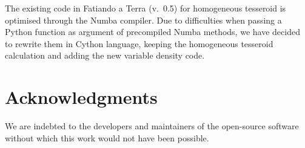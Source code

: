 \documentclass[extra]{gji}
\begin{document}
The existing code in Fatiando a Terra (v.~0.5) for homogeneous tesseroid is optimised through the Numba compiler.
Due to difficulties when passing a Python function as argument of precompiled Numba methods, we have decided to rewrite them in Cython language, keeping the homogeneous tesseroid calculation and adding the new variable density code.



\section{Acknowledgments}

We are indebted to the developers and maintainers of the open-source
software without which this work would not have been possible.




\end{document}
